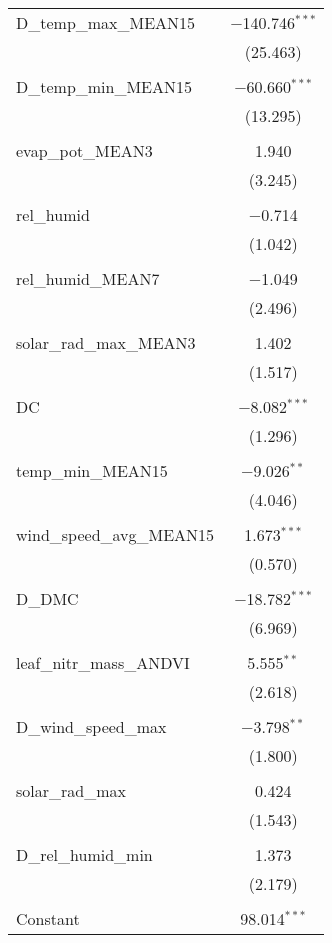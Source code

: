 \begin{table}[!htbp]
\begin{tabular}{@{\extracolsep{5pt}}lc}
 D\_temp\_max\_MEAN15 & $-$140.746$^{***}$ \\ 
  & (25.463) \\ 
  & \\ 
 D\_temp\_min\_MEAN15 & $-$60.660$^{***}$ \\ 
  & (13.295) \\ 
  & \\ 
 evap\_pot\_MEAN3 & 1.940 \\ 
  & (3.245) \\ 
  & \\ 
 rel\_humid & $-$0.714 \\ 
  & (1.042) \\ 
  & \\ 
 rel\_humid\_MEAN7 & $-$1.049 \\ 
  & (2.496) \\ 
  & \\ 
 solar\_rad\_max\_MEAN3 & 1.402 \\ 
  & (1.517) \\ 
  & \\ 
 DC & $-$8.082$^{***}$ \\ 
  & (1.296) \\ 
  & \\ 
 temp\_min\_MEAN15 & $-$9.026$^{**}$ \\ 
  & (4.046) \\ 
  & \\ 
 wind\_speed\_avg\_MEAN15 & 1.673$^{***}$ \\ 
  & (0.570) \\ 
  & \\ 
 D\_DMC & $-$18.782$^{***}$ \\ 
  & (6.969) \\ 
  & \\ 
 leaf\_nitr\_mass\_ANDVI & 5.555$^{**}$ \\ 
  & (2.618) \\ 
  & \\ 
 D\_wind\_speed\_max & $-$3.798$^{**}$ \\ 
  & (1.800) \\ 
  & \\ 
 solar\_rad\_max & 0.424 \\ 
  & (1.543) \\ 
  & \\ 
 D\_rel\_humid\_min & 1.373 \\ 
  & (2.179) \\ 
  & \\ 
 Constant & 98.014$^{***}$ \\ 

\end{tabular}
\end{table}

